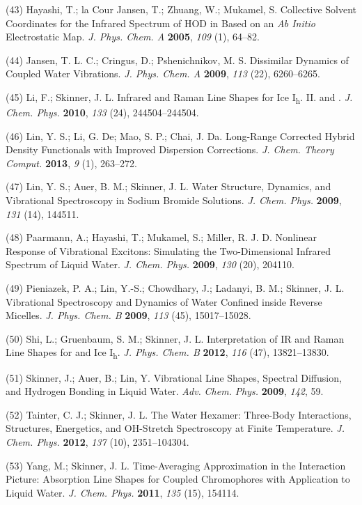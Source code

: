 \documentclass[]{article}
\begin{document}
(43) Hayashi, T.; la Cour Jansen, T.; Zhuang, W.; Mukamel, S. Collective Solvent Coordinates for the Infrared Spectrum of HOD in  Based on an \emph{Ab Initio} Electrostatic Map.  \emph{J. Phys. Chem. A} \textbf{2005}, \emph{109} (1), 64--82.

(44) Jansen, T. L. C.; Cringus, D.; Pshenichnikov, M. S. Dissimilar Dynamics of Coupled Water Vibrations. \emph{J. Phys. Chem. A} \textbf{2009}, \emph{113} (22), 6260--6265.

(45) Li, F.; Skinner, J. L. Infrared and Raman Line Shapes for Ice I\textsubscript{h}. II.  and .  \emph{J. Chem. Phys.} \textbf{2010}, \emph{133} (24), 244504--244504.

(46) Lin, Y. S.; Li, G. De; Mao, S. P.; Chai, J. Da. Long-Range Corrected Hybrid Density Functionals with Improved Dispersion Corrections. \emph{J. Chem. Theory Comput.} \textbf{2013}, \emph{9} (1), 263--272.

(47) Lin, Y. S.; Auer, B. M.; Skinner, J. L. Water Structure, Dynamics, and Vibrational Spectroscopy in Sodium Bromide Solutions. \emph{J. Chem.  Phys.} \textbf{2009}, \emph{131} (14), 144511.

(48) Paarmann, A.; Hayashi, T.; Mukamel, S.; Miller, R. J. D. Nonlinear Response of Vibrational Excitons: Simulating the Two-Dimensional Infrared Spectrum of Liquid Water. \emph{J. Chem. Phys.} \textbf{2009}, \emph{130} (20), 204110.

(49) Pieniazek, P. A.; Lin, Y.-S.; Chowdhary, J.; Ladanyi, B. M.; Skinner, J. L. Vibrational Spectroscopy and Dynamics of Water Confined inside Reverse Micelles. \emph{J. Phys. Chem. B} \textbf{2009}, \emph{113} (45), 15017--15028.

(50) Shi, L.; Gruenbaum, S. M.; Skinner, J. L. Interpretation of IR and Raman Line Shapes for  and  Ice I\textsubscript{h}. \emph{J. Phys. Chem. B} \textbf{2012}, \emph{116} (47), 13821--13830.

(51) Skinner, J.; Auer, B.; Lin, Y. Vibrational Line Shapes, Spectral Diffusion, and Hydrogen Bonding in Liquid Water. \emph{Adv.}  \emph{Chem.} \emph{Phys.} \textbf{2009}, \emph{142}, 59.

(52) Tainter, C. J.; Skinner, J. L. The Water Hexamer: Three-Body Interactions, Structures, Energetics, and OH-Stretch Spectroscopy at Finite Temperature. \emph{J. Chem. Phys.} \textbf{2012}, \emph{137} (10), 2351--104304.

(53) Yang, M.; Skinner, J. L. Time-Averaging Approximation in the Interaction Picture: Absorption Line Shapes for Coupled Chromophores with Application to Liquid Water. \emph{J. Chem. Phys.} \textbf{2011}, \emph{135} (15), 154114.
\end{document}
